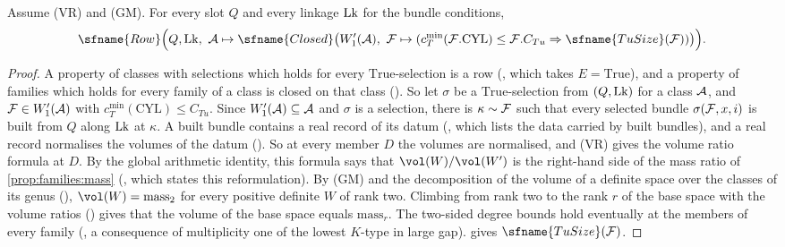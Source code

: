 \begin{proposition}\label{pf:stageU:hTu}
Assume \textup{(VR)} and \textup{(GM)}. For every slot $Q$ and every linkage $\mathrm{Lk}$ for the bundle conditions,
\[
\sfname{Row}\Bigl(Q,\stageULk,\ \stageUA\mapsto\sfname{Closed}\bigl(W'_1(\stageUA),\ \stageUFm\mapsto
(c_T^{\min}(\stageUFm.\mathrm{CYL})\le\stageUFm.C_{Tu}\Rightarrow\sfname{TuSize}(\stageUFm))\bigr)\Bigr).
\]
\end{proposition}

\begin{proof}
A property of classes with selections which holds for every $\mathrm{True}$-selection is a row
(, which takes $E=\mathrm{True}$), and a property of families which holds for every
family of a class is closed on that class (). So let $\sigma$ be a
$\mathrm{True}$-selection from $(Q,\mathrm{Lk})$ for a class $\mathcal{A}$, and $\mathcal{F}\in W'_1(\mathcal{A})$ with
$c_T^{\min}(\mathrm{CYL})\le C_{Tu}$. Since $W'_1(\mathcal{A})\subseteq\mathcal{A}$ and $\sigma$ is a selection, there is
$\kappa\sim\mathcal{F}$ such that every selected bundle $\sigma(\mathcal{F},x,i)$ is built from $Q$ along $\mathrm{Lk}$ at $\kappa$.
A built bundle contains a real record of its datum (, which lists the data carried
by built bundles), and a real record normalises the volumes of the datum
(). So at every member $D$ the volumes are normalised, and (VR)
gives the volume ratio formula at $D$. By the global arithmetic identity, this formula says that $\vol(W)/\vol(W')$ is the
right-hand side of the mass ratio of \cref{prop:families:mass}
(, which states this reformulation). By (GM) and
the decomposition of the volume of a definite space over the classes of its genus
(), $\vol(W)=\mathrm{mass}_2$ for every
positive definite $W$ of rank two. Climbing from rank two to the rank $r$ of the base space with the volume ratios
() gives that the volume of the base
space equals $\mathrm{mass}_r$. The two-sided degree bounds hold eventually at the members of every family
(, a consequence of multiplicity one of the
lowest $K$-type in large gap).  gives $\sfname{TuSize}(\stageUFm)$.
\end{proof}

